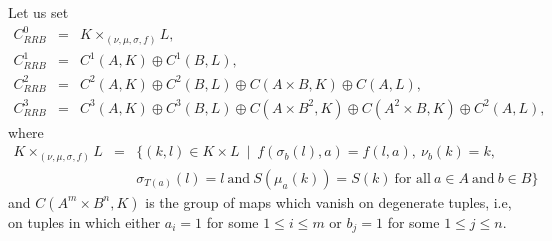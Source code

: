 \documentclass[11pt]{amsart}
\theoremstyle{thrm}
\theoremstyle{plain}
\theoremstyle{definition}
\numberwithin{equation}{section}
\begin{document}
Let us set 
\begin{eqnarray*}
	C^0_{RRB} & = & K \times_{(\nu, \mu, \sigma, f) } L,\\
	C^{1}_{RRB} &=& C^1(A, K) \oplus C^1(B,L),\\
	C^{2}_{RRB} &=& C^2(A, K) \oplus C^2(B,L) \oplus C(A \times B, K) \oplus C(A,L),\\
	C^{3}_{RRB} &=& C^3(A, K) \oplus C^3(B,L) \oplus C(A \times B^2, K) \oplus C(A^2 \times B, K) \oplus C^2(A,L),
\end{eqnarray*}
where 
\begin{eqnarray*}
	K \times_{(\nu, \mu, \sigma, f) } L &=& \big\{ (k,l) \in K \times L ~\mid ~ f(\sigma_b(l), a)=f(l,a),~ \nu_b(k) = k,\\
	&& \sigma_{T(a)}(l)=l ~\textrm{and}~ S(\mu_a(k))=S(k) ~\textrm{for all}~ a \in A~\textrm{and}~ b \in B \big\}
\end{eqnarray*} 
and  $C(A^m \times B^n, K)$ is the group of maps which vanish on degenerate tuples, i.e, on tuples in which either $a_i=1$ for some $1\leq i\leq m$ or  $b_j=1$ for some $1\leq j\leq n$.
\par
\end{document}
